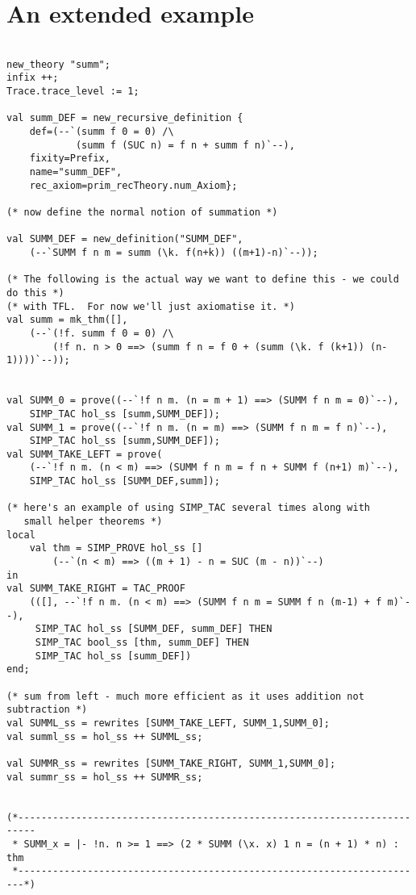 \documentclass[a4]{article}
\begin{document}
\section{An extended example}
\label{extended-example}

\begin{verbatim}

new_theory "summ";
infix ++;
Trace.trace_level := 1;

val summ_DEF = new_recursive_definition {
    def=(--`(summ f 0 = 0) /\
            (summ f (SUC n) = f n + summ f n)`--),
    fixity=Prefix,
    name="summ_DEF",
    rec_axiom=prim_recTheory.num_Axiom};

(* now define the normal notion of summation *)

val SUMM_DEF = new_definition("SUMM_DEF",
    (--`SUMM f n m = summ (\k. f(n+k)) ((m+1)-n)`--));

(* The following is the actual way we want to define this - we could do this *)
(* with TFL.  For now we'll just axiomatise it. *)
val summ = mk_thm([],
    (--`(!f. summ f 0 = 0) /\
        (!f n. n > 0 ==> (summ f n = f 0 + (summ (\k. f (k+1)) (n-1))))`--));


val SUMM_0 = prove((--`!f n m. (n = m + 1) ==> (SUMM f n m = 0)`--),
    SIMP_TAC hol_ss [summ,SUMM_DEF]);
val SUMM_1 = prove((--`!f n m. (n = m) ==> (SUMM f n m = f n)`--),
    SIMP_TAC hol_ss [summ,SUMM_DEF]);
val SUMM_TAKE_LEFT = prove(
    (--`!f n m. (n < m) ==> (SUMM f n m = f n + SUMM f (n+1) m)`--),
    SIMP_TAC hol_ss [SUMM_DEF,summ]);

(* here's an example of using SIMP_TAC several times along with
   small helper theorems *)
local
    val thm = SIMP_PROVE hol_ss []
        (--`(n < m) ==> ((m + 1) - n = SUC (m - n))`--)
in
val SUMM_TAKE_RIGHT = TAC_PROOF
    (([], --`!f n m. (n < m) ==> (SUMM f n m = SUMM f n (m-1) + f m)`--),
     SIMP_TAC hol_ss [SUMM_DEF, summ_DEF] THEN
     SIMP_TAC bool_ss [thm, summ_DEF] THEN
     SIMP_TAC hol_ss [summ_DEF])
end;

(* sum from left - much more efficient as it uses addition not subtraction *)
val SUMML_ss = rewrites [SUMM_TAKE_LEFT, SUMM_1,SUMM_0];
val summl_ss = hol_ss ++ SUMML_ss;

val SUMMR_ss = rewrites [SUMM_TAKE_RIGHT, SUMM_1,SUMM_0];
val summr_ss = hol_ss ++ SUMMR_ss;


(*-------------------------------------------------------------------------
 * SUMM_x = |- !n. n >= 1 ==> (2 * SUMM (\x. x) 1 n = (n + 1) * n) : thm
 *-----------------------------------------------------------------------*)


\end{verbatim}
\end{document}

